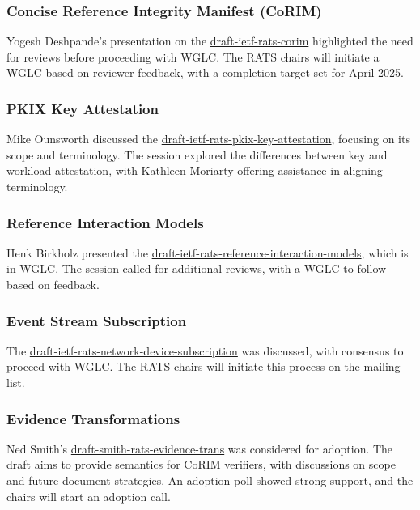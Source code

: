 \documentclass{article}
\begin{document}
\subsubsection{Concise Reference Integrity Manifest (CoRIM)}
Yogesh Deshpande's presentation on the \href{https://datatracker.ietf.org/doc/draft-ietf-rats-corim/}{draft-ietf-rats-corim} highlighted the need for reviews before proceeding with WGLC. The RATS chairs will initiate a WGLC based on reviewer feedback, with a completion target set for April 2025.

\subsubsection{PKIX Key Attestation}
Mike Ounsworth discussed the \href{https://datatracker.ietf.org/doc/draft-ietf-rats-pkix-key-attestation/}{draft-ietf-rats-pkix-key-attestation}, focusing on its scope and terminology. The session explored the differences between key and workload attestation, with Kathleen Moriarty offering assistance in aligning terminology.

\subsubsection{Reference Interaction Models}
Henk Birkholz presented the \href{https://datatracker.ietf.org/doc/draft-ietf-rats-reference-interaction-models/}{draft-ietf-rats-reference-interaction-models}, which is in WGLC. The session called for additional reviews, with a WGLC to follow based on feedback.

\subsubsection{Event Stream Subscription}
The \href{https://datatracker.ietf.org/doc/draft-ietf-rats-network-device-subscription/}{draft-ietf-rats-network-device-subscription} was discussed, with consensus to proceed with WGLC. The RATS chairs will initiate this process on the mailing list.

\subsubsection{Evidence Transformations}
Ned Smith's \href{https://datatracker.ietf.org/doc/draft-smith-rats-evidence-trans/}{draft-smith-rats-evidence-trans} was considered for adoption. The draft aims to provide semantics for CoRIM verifiers, with discussions on scope and future document strategies. An adoption poll showed strong support, and the chairs will start an adoption call.
\end{document}
